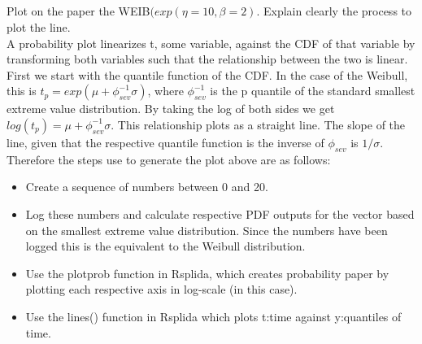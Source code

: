 \documentclass{article}
\begin{document}
\subsection{}
Plot on the paper the WEIB\begin{math}(exp(\eta = 10, \beta = 2).\end{math}
Explain clearly the process to plot the line.\\

A probability plot linearizes t, some variable, against the CDF of that variable by transforming both variables such that the relationship between the two is linear.  First we start with the quantile function of the CDF.  In the case of the Weibull, this is \(t_p = exp(\mu + \phi_{sev}^{-1} \sigma)\), where \(\phi_{sev}^{-1}\) is the p quantile of the standard smallest extreme value distribution.  By taking the log of both sides we get \(log(t_p) = \mu + \phi_{sev}^{-1} \sigma\).  This relationship plots as a straight line.  The slope of the line, given that the respective quantile function is the inverse of  \(\phi_{sev}\) is \(1/\sigma\).\\

Therefore the steps use to generate the plot above are as follows:\\
\begin{itemize}
\item Create a sequence of numbers between 0 and 20.\\

\item Log these numbers and calculate respective PDF outputs for the vector based on the smallest extreme value distribution.  Since the numbers have been logged this is the equivalent to the Weibull distribution.

\item Use the plotprob function in Rsplida, which creates probability paper by plotting each respective axis in log-scale (in this case).

\item Use the lines() function in Rsplida which plots t:time against y:quantiles of time.
\end{itemize}
\end{document}
